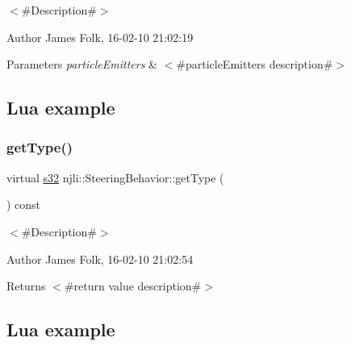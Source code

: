 $<$\#\+Description\#$>$ 

\begin{DoxyAuthor}{Author}
James Folk, 16-\/02-\/10 21\+:02\+:19
\end{DoxyAuthor}

\begin{DoxyParams}{Parameters}
{\em particle\+Emitters} & $<$\#particle\+Emitters description\#$>$\\
\hline
\end{DoxyParams}
\hypertarget{classnjli_1_1_steering_behavior_wander_ex1}{}\subsection{Lua example}\label{classnjli_1_1_steering_behavior_wander_ex1}

\begin{DoxyCodeInclude}
\end{DoxyCodeInclude}
\mbox{\label{classnjli_1_1_steering_behavior_ae82bca8468d41aff8c22b76fd359fe9b}} 
\subsubsection{\texorpdfstring{get\+Type()}{getType()}}
{\footnotesize\ttfamily virtual \mbox{\hyperlink{_util_8h_aa62c75d314a0d1f37f79c4b73b2292e2}{s32}} njli\+::\+Steering\+Behavior\+::get\+Type (\begin{DoxyParamCaption}{ }\end{DoxyParamCaption}) const\hspace{0.3cm}{\ttfamily [virtual]}}



$<$\#\+Description\#$>$ 

\begin{DoxyAuthor}{Author}
James Folk, 16-\/02-\/10 21\+:02\+:54
\end{DoxyAuthor}
\begin{DoxyReturn}{Returns}
$<$\#return value description\#$>$
\end{DoxyReturn}
\hypertarget{classnjli_1_1_steering_behavior_wander_ex1}{}\subsection{Lua example}\label{classnjli_1_1_steering_behavior_wander_ex1}

